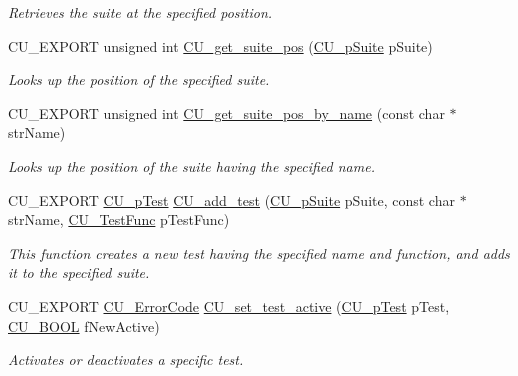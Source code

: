 \begin{DoxyCompactItemize}
\begin{DoxyCompactList}\small\item\em Retrieves the suite at the specified position. \end{DoxyCompactList}\item 
C\-U\-\_\-\-E\-X\-P\-O\-R\-T unsigned int \hyperlink{group__Framework_ga49a20837af93245aa578935758c7810c}{C\-U\-\_\-get\-\_\-suite\-\_\-pos} (\hyperlink{group__Framework_gaba832ae8b235f5e70d6a4ac9c3bb1219}{C\-U\-\_\-p\-Suite} p\-Suite)
\begin{DoxyCompactList}\small\item\em Looks up the position of the specified suite. \end{DoxyCompactList}\item 
C\-U\-\_\-\-E\-X\-P\-O\-R\-T unsigned int \hyperlink{group__Framework_gab8f529d5919f590593210eb2dcec37f1}{C\-U\-\_\-get\-\_\-suite\-\_\-pos\-\_\-by\-\_\-name} (const char $\ast$str\-Name)
\begin{DoxyCompactList}\small\item\em Looks up the position of the suite having the specified name. \end{DoxyCompactList}\item 
C\-U\-\_\-\-E\-X\-P\-O\-R\-T \hyperlink{group__Framework_ga249c43fbe4e53452b3f90db1437da04b}{C\-U\-\_\-p\-Test} \hyperlink{group__Framework_gad9f198a8a5fa8cc6870c3c8be873869f}{C\-U\-\_\-add\-\_\-test} (\hyperlink{group__Framework_gaba832ae8b235f5e70d6a4ac9c3bb1219}{C\-U\-\_\-p\-Suite} p\-Suite, const char $\ast$str\-Name, \hyperlink{group__Framework_ga5868148b642b30635b8fe7f095c5b493}{C\-U\-\_\-\-Test\-Func} p\-Test\-Func)
\begin{DoxyCompactList}\small\item\em This function creates a new test having the specified name and function, and adds it to the specified suite. \end{DoxyCompactList}\item 
C\-U\-\_\-\-E\-X\-P\-O\-R\-T \hyperlink{group__Framework_ga743a2a025ee3eb792d7d85f0eea347e6}{C\-U\-\_\-\-Error\-Code} \hyperlink{group__Framework_gae13d2e11720784d22aa15713be90ce72}{C\-U\-\_\-set\-\_\-test\-\_\-active} (\hyperlink{group__Framework_ga249c43fbe4e53452b3f90db1437da04b}{C\-U\-\_\-p\-Test} p\-Test, \hyperlink{group__Framework_gabd98d449e979a6379b06551242106dd4}{C\-U\-\_\-\-B\-O\-O\-L} f\-New\-Active)
\begin{DoxyCompactList}\small\item\em Activates or deactivates a specific test. \end{DoxyCompactList}\item 

\end{DoxyCompactItemize}
